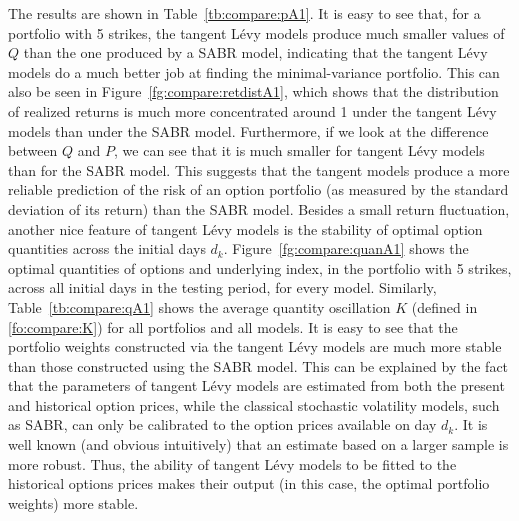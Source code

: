 \documentclass{article}
\numberwithin{equation}{section}
\begin{document}
The results are shown in Table~\ref{tb:compare:pA1}. It is easy to see that, for a portfolio with 5 strikes, the tangent L\'{e}vy models produce much smaller values of $Q$ than the one produced by a SABR model, indicating that the tangent L\'{e}vy models do a much better job at finding the minimal-variance portfolio. This can also be seen in Figure~\ref{fg:compare:retdistA1}, which shows that the distribution of realized returns is much more concentrated around 1 under the tangent L\'{e}vy models than under the SABR model. 
Furthermore, if we look at the difference between $Q$ and $P$, we can see that it is much smaller for tangent L\'{e}vy models than for the SABR model. This suggests that the tangent models produce a more reliable prediction of the risk of an option portfolio (as measured by the standard deviation of its return) than the SABR model. Besides a small return fluctuation, another nice feature of tangent L\'{e}vy models is the stability of optimal option quantities across the initial days $d_k$. Figure~\ref{fg:compare:quanA1} shows the optimal quantities of options and underlying index, in the portfolio with 5 strikes, across all initial days in the testing period, for every model. Similarly, Table~\ref{tb:compare:qA1} shows the average quantity oscillation $K$ (defined in \eqref{fo:compare:K}) for all portfolios and all models. 
It is easy to see that the portfolio weights constructed via the tangent L\'{e}vy models are much more stable than those constructed using the SABR model. This can be explained by the fact that the parameters of tangent L\'evy models are estimated from both the present and historical option prices, while the classical stochastic volatility models, such as SABR, can only be calibrated to the option prices available on day $d_k$. It is well known (and obvious intuitively) that an estimate based on a larger sample is more robust. Thus, the ability of tangent L\'evy models to be fitted to the historical options prices makes their output (in this case, the optimal portfolio weights) more stable. 
\end{document}
